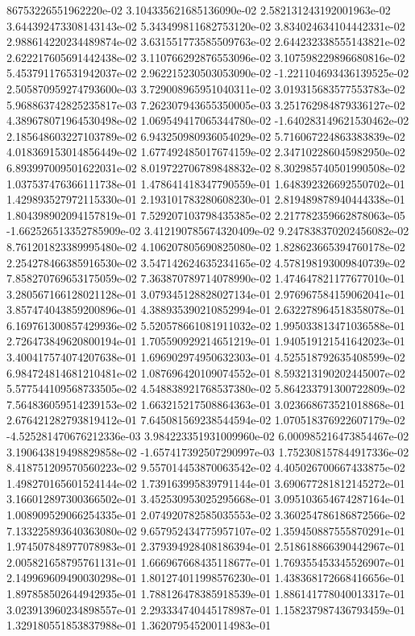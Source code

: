 86753226551962220e-02	3.104335621685136090e-02	2.582131243192001963e-02	3.644392473308143143e-02	5.343499811682753120e-02	3.834024634104442331e-02	2.988614220234489874e-02	3.631551773585509763e-02	2.644232338555143821e-02	2.622217605691442438e-02	3.110766292876553096e-02	3.107598229896680816e-02	5.453791176531942037e-02	2.962215230503053090e-02	-1.221104693436139525e-02	2.505870959274793600e-03	3.729008965951040311e-02	3.019315683577553783e-02	5.968863742825235817e-03	7.262307943655350005e-03	3.251762984879336127e-02	4.389678071964530498e-02	1.069549417065344780e-02	-1.640283149621530462e-02	2.185648603227103789e-02	6.943250980936054029e-02	5.716067224863383839e-02	4.018369153014856449e-02	1.677492485017674159e-02	2.347102286045982950e-02	6.893997009501622031e-02	8.019722706789848832e-02	8.302985740501990508e-02	1.037537476366111738e-01	1.478641418347790559e-01	1.648392326692550702e-01	1.429893527972115330e-01	2.193101783280608230e-01	2.819489878940444338e-01	1.804398902094157819e-01	7.529207103798435385e-02	2.217782359662878063e-05	-1.662526513352785909e-02	3.412190785674320409e-02	9.247838370202456082e-02	8.761201823389995480e-02	4.106207805690825080e-02	1.828623665394760178e-02	2.254278466385916530e-02	3.547142624635234165e-02	4.578198193009840739e-02	7.858270769653175059e-02	7.363870789714078990e-02	1.474647821177677010e-01	3.280567166128021128e-01	3.079345128828027134e-01	2.976967584159062041e-01	3.857474043859200896e-01	4.388935390210852994e-01	2.632278964518358078e-01	6.169761300857429936e-02	5.520578661081911032e-02	1.995033813471036588e-01	2.726473849620800194e-01	1.705590929214651219e-01	1.940519121541642023e-01	3.400417574074207638e-01	1.696902974950632303e-01	4.525518792635408599e-02	6.984724814681210481e-02	1.087696420109074552e-01	8.593213190202445007e-02	5.577544109568733505e-02	4.548838921768537380e-02	5.864233791300722809e-02	7.564836059514239153e-02	1.663215217508864363e-01	3.023668673521018868e-01	2.676421282793819412e-01	7.645081569238544594e-02	1.070518376922607179e-02	-4.525281470676212336e-03	3.984223351931009960e-02	6.000985216473854467e-02	3.190643819498829858e-02	-1.657417392507290997e-03	1.752308157844917336e-02	8.418751209570560223e-02	9.557014453870063542e-02	4.405026700667433875e-02	1.498270165601524144e-02	1.739163995839791144e-01	3.690677281812145272e-01	3.166012897300366502e-01	3.452530953025295668e-01	3.095103654674287164e-01	1.008909529066254335e-01	2.074920782585035553e-02	3.360254786186872566e-02	7.133225893640363080e-02	9.657952434775957107e-02	1.359450887555870291e-01	1.974507848977078983e-01	2.379394928408186394e-01	2.518618866390442967e-01	2.005821658795761131e-01	1.666967668435118677e-01	1.769355453345526907e-01	2.149969609490030298e-01	1.801274011998576230e-01	1.438368172668416656e-01	1.897858502644942935e-01	1.788126478385918539e-01	1.886141778040013317e-01	3.023913960234898557e-01	2.293334740445178987e-01	1.158237987436793459e-01	1.329180551853837988e-01	1.362079545200114983e-01
